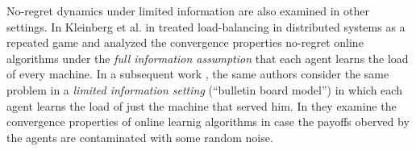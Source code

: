 No-regret dynamics under limited information are also examined
in other settings. In Kleinberg et al. in \cite{KPT09} treated
load-balancing in distributed systems as
a repeated game and analyzed the convergence properties
no-regret online algorithms under the \emph{full information assumption}
that each agent learns the load of every machine.
In a subsequent work \cite{KPT11}, the same authors consider the
same problem in a \emph{limited information setting} (\enquote{bulletin board model})
in which each agent learns the load of just the machine
that served him. In \cite{HCM17,MS17} they examine the convergence
properties of online learnig algorithms in case the payoffs oberved
by the agents are contaminated with some random noise.





